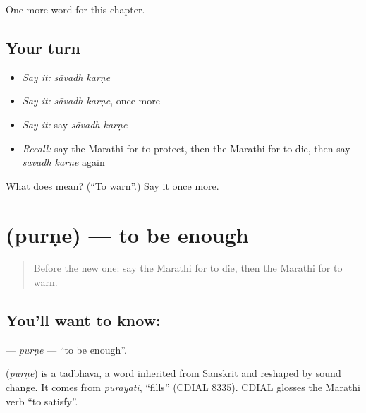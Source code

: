\begin{grammarlens}[title={What you've built}]
One more word for this chapter.
\end{grammarlens}

\subsection*{Your turn}
\begin{itemize}
\raggedright
  \item \emph{Say it:} \emph{sāvadh karṇe}
  \item \emph{Say it:} \emph{sāvadh karṇe}, once more
  \item \emph{Say it:} say \emph{sāvadh karṇe}
  \item \emph{Recall:} say the Marathi for to protect, then the Marathi for to die, then say \emph{sāvadh karṇe} again
\end{itemize}

\begin{tcolorbox}[breakable,colback=teal!4,colframe=teal!35!black,title={Before you move on}]
What does   mean? (\textquotedblleft{}To warn\textquotedblright{}.) Say it once more.
\end{tcolorbox}
\section[\texorpdfstring{\mr{पुरणे} (purṇe)}{पुरणे (purṇe)}]{ (purṇe) — to be enough}

\label{lesson:MR-C195-purne}



\begin{quote}
Before the new one: say the Marathi for to die, then the Marathi for to warn.
\end{quote}

\subsection*{You'll want to know: }
\textbf{} — \emph{purṇe} — \textquotedblleft{}to be enough\textquotedblright{}.

\begin{cousinweb}
\textbf{} (\emph{purṇe}) is a tadbhava, a word inherited from Sanskrit and reshaped by sound change. It comes from \emph{pūrayati}, \textquotedblleft{}fills\textquotedblright{} (CDIAL 8335). CDIAL glosses the Marathi verb \textquotedblleft{}to satisfy\textquotedblright{}.
\end{cousinweb}

